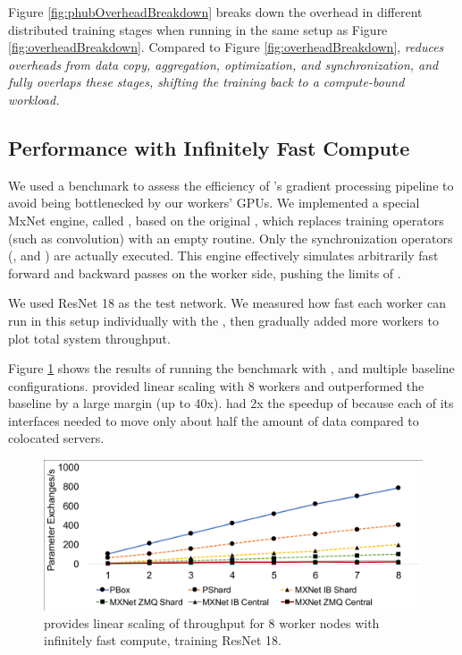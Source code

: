 Figure \ref{fig:phubOverheadBreakdown} breaks down the overhead in different distributed training stages when running \phub in the same setup as Figure \ref{fig:overheadBreakdown}. Compared to Figure \ref{fig:overheadBreakdown}, \textit{\phub reduces overheads from data copy, aggregation, optimization, and synchronization, and fully overlaps these stages, shifting the training back to a compute-bound workload.}


\subsection{Performance with Infinitely Fast Compute}
We used a benchmark to assess the efficiency of \phub{}'s gradient processing pipeline to avoid being bottlenecked by our workers' GPUs. We implemented a special MxNet engine, called , based on the original , which replaces training operators (such as convolution) with an empty routine. Only the synchronization operators (,  and ) are actually executed. This engine effectively simulates arbitrarily fast forward and backward passes on the worker side, pushing the limits of \phub.

We used ResNet 18 as the test network. We measured how fast each worker can run in this setup individually with the \pbox, then gradually added more workers to plot total system throughput.


Figure \ref{fig:FakeTrainingWithAggOpt} shows the results of running the benchmark with \pbox, \pshard and multiple baseline configurations. \pbox  provided linear scaling with 8 workers and outperformed the baseline by a large margin (up to 40x). \pbox had 2x the speedup of \pshard{} because each of its interfaces needed to move only about half the amount of data compared to colocated servers.

\begin{figure}[t!]
    \centering
	\includegraphics[width=.7\linewidth,trim=3 1 1 3,clip]{Figures/FakeTrainingWithAggOpt.pdf}
	\caption{\pbox provides linear scaling of throughput for 8 worker nodes with infinitely fast compute, training ResNet 18.}
	\label{fig:FakeTrainingWithAggOpt}
\end{figure}


